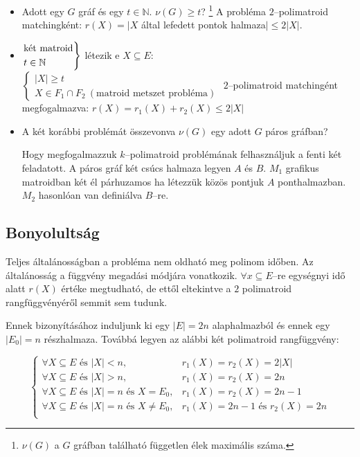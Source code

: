 \begin{itemize}
  \item Adott egy $G$ gráf és egy $t \in \mathbb{N}$. $\nu(G) \geq t$? \footnote{
   $\nu(G)$ a $G$ gráfban található független élek maximális száma.
  } A probléma $2$--polimatroid matchingként: $r(X)=|X$
  által lefedett pontok halmaza$| \leq 2|X|$.
  \item $\begin{rcases}
  \mbox{két matroid} \\
  t \in \mathbb{N}
  \end{rcases}$ létezik  e $X \subseteq E$: $\begin{cases}
  |X| \geq t \\
  X \in F_1 \cap F_2~(\mbox{matroid metszet probléma})
  \end{cases}$ 
  $2$--polimatroid matchingént megfogalmazva: $r(X)=r_1(X)+r_2(X) \leq 2|X|$
  \item A két korábbi problémát összevonva $\nu(G)$ egy adott $G$ páros gráfban?
  
  Hogy megfogalmazzuk $k$--polimatroid problémának felhasználjuk a fenti két
  feladatott. A páros gráf két csúcs halmaza legyen $A$ és $B$. $M_1$ grafikus
  matroidban két él párhuzamos ha létezzük közös pontjuk $A$ ponthalmazban.
  $M_2$ hasonlóan van definiálva $B$--re. 
\end{itemize}

\subsection{Bonyolultság}
Teljes általánosságban a probléma nem oldható meg polinom időben. Az általánosság
a függvény megadási módjára vonatkozik. $\forall x \subseteq E$--re egységnyi
idő alatt $r(X)$ értéke megtudható, de ettől eltekintve a $2$ polimatroid
rangfüggvényéről semmit sem tudunk.

Ennek bizonyításához induljunk ki egy $|E|=2n$ alaphalmazból és ennek egy
$|E_0|=n$ részhalmaza. Továbbá legyen az alábbi két polimatroid rangfüggvény:

\[
\begin{cases}
\forall X \subseteq E \mbox{ és } |X|<n, & r_1(X)=r_2(X)=2|X| \\
\forall X \subseteq E \mbox{ és } |X|>n, & r_1(X)=r_2(X)=2n \\
\forall X \subseteq E \mbox{ és } |X|=n \mbox{ és } X = E_0, & r_1(X)=r_2(X)=2n-1\\
\forall X \subseteq E \mbox{ és } |X|=n \mbox{ és } X \neq E_0, & r_1(X)=2n-1 \mbox{ és }r_2(X)=2n\\
\end{cases}
\]

